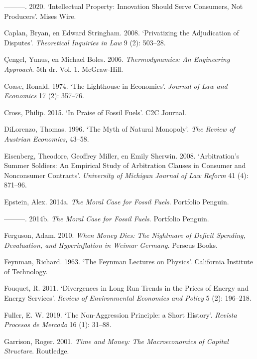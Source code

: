 \documentclass[
  a5paper,
  smalldemyvopaper,11pt,twoside,onecolumn,openright,extrafontsizes,
hidelinks]{memoir}
\newlength{\cslhangindent}
\newenvironment{CSLReferences}[2] %
 {\begin{list}{}{%
  \setlength{\itemindent}{0pt}
  \setlength{\leftmargin}{0pt}
  \setlength{\parsep}{0pt}
  \ifodd #1
   \setlength{\leftmargin}{\cslhangindent}
   \setlength{\itemindent}{-1\cslhangindent}
  \fi
  \setlength{\itemsep}{#2\baselineskip}}}
 {\end{list}}
\begin{document}
\begin{CSLReferences}{1}{0}
---------. 2020. {`Intellectual Property: Innovation Should Serve
Consumers, Not Producers'}. Mises Wire.

Caplan, Bryan, en Edward Stringham. 2008. {`Privatizing the Adjudication
of Disputes'}. \emph{Theoretical Inquiries in Law} 9 (2): 503--28.

Çengel, Yunus, en Michael Boles. 2006. \emph{Thermodynamics: An
Engineering Approach}. 5th dr. Vol. 1. McGraw-Hill.

Coase, Ronald. 1974. {`The Lighthouse in Economics'}. \emph{Journal of
Law and Economics} 17 (2): 357--76.

Cross, Philip. 2015. {`In Praise of Fossil Fuels'}. C2C Journal.

DiLorenzo, Thomas. 1996. {`The Myth of Natural Monopoly'}. \emph{The
Review of Austrian Economics}, 43--58.

Eisenberg, Theodore, Geoffrey Miller, en Emily Sherwin. 2008.
{`Arbitration's Summer Soldiers: An Empirical Study of Arbitration
Clauses in Consumer and Nonconsumer Contracts'}. \emph{University of
Michigan Journal of Law Reform} 41 (4): 871--96.

Epstein, Alex. 2014a. \emph{The Moral Case for Fossil Fuels}. Portfolio
Penguin.

---------. 2014b. \emph{The Moral Case for Fossil Fuels}. Portfolio
Penguin.

Ferguson, Adam. 2010. \emph{When Money Dies: The Nightmare of Deficit
Spending, Devaluation, and Hyperinflation in Weimar Germany}. Perseus
Books.

Feynman, Richard. 1963. {`The Feynman Lectures on Physics'}. California
Institute of Technology.

Fouquet, R. 2011. {`Divergences in Long Run Trends in the Prices of
Energy and Energy Services'}. \emph{Review of Environmental Economics
and Policy} 5 (2): 196--218.

Fuller, E. W. 2019. {`The Non-Aggression Principle: a Short History'}.
\emph{Revista Procesos de Mercado} 16 (1): 31--88.

Garrison, Roger. 2001. \emph{Time and Money: The Macroeconomics of
Capital Structure}. Routledge.


\end{CSLReferences}
\end{document}
